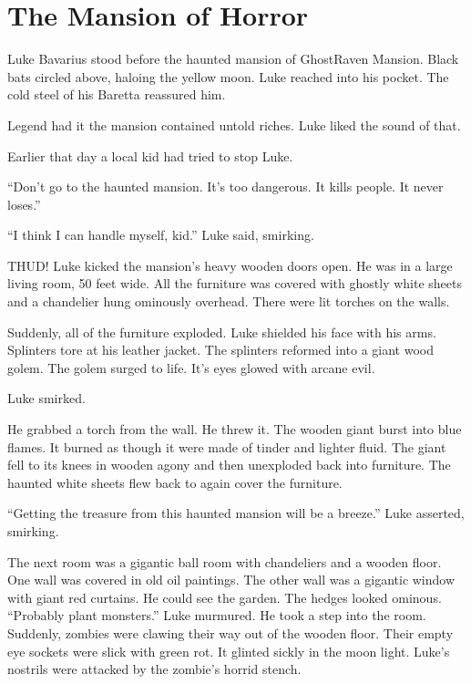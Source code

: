 \chapter{The Mansion of Horror}





Luke Bavarius stood before the haunted mansion of GhostRaven
Mansion. Black bats circled above, haloing the yellow moon. Luke
reached into his pocket. The cold steel of his Baretta reassured
him.



Legend had it the mansion contained untold riches. Luke liked the
sound of that.



Earlier that day a local kid had tried to stop Luke.

``Don't go to the haunted mansion. It's too
dangerous. It kills people. It never loses.''

``I think I can handle myself, kid.'' Luke said,
smirking.



THUD! Luke kicked the mansion's heavy wooden doors open. He
was in a large living room, 50 feet wide. All the furniture was
covered with ghostly white sheets and a chandelier hung ominously
overhead. There were lit torches on the walls.



Suddenly, all of the furniture exploded. Luke shielded his face
with his arms. Splinters tore at his leather jacket. The splinters
reformed into a giant wood golem. The golem surged to life.
It's eyes glowed with arcane evil.



Luke smirked.



He grabbed a torch from the wall. He threw it. The wooden giant
burst into blue flames. It burned as though it were made of tinder
and lighter fluid. The giant fell to its knees in wooden agony and
then unexploded back into furniture. The haunted white sheets flew
back to again cover the furniture.



``Getting the treasure from this haunted mansion will be a
breeze.'' Luke asserted, smirking.



The next room was a gigantic ball room with chandeliers and a
wooden floor. One wall was covered in old oil paintings. The other
wall was a gigantic window with giant red curtains. He could see
the garden. The hedges looked ominous. ``Probably plant
monsters.'' Luke murmured. He took a step into the room.
Suddenly, zombies were clawing their way out of the wooden floor.
Their empty eye sockets were slick with green rot. It glinted
sickly in the moon light. Luke's nostrils were attacked by
the zombie's horrid stench.



